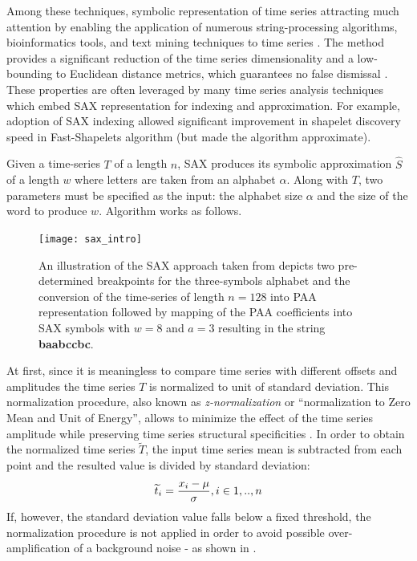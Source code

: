 Among these techniques, symbolic representation of time series attracting much attention by enabling the application of numerous 
string-processing algorithms, bioinformatics tools, and text mining techniques to time series \cite{sax}. 
The method provides a significant reduction of the time series dimensionality and a low-bounding to Euclidean distance 
metrics, which guarantees no false dismissal \cite{citeulike:2821475}. 
These properties are often leveraged by many time series analysis techniques which embed SAX representation for indexing and 
approximation. For example, adoption of SAX indexing allowed significant improvement in shapelet discovery speed in Fast-Shapelets 
algorithm \cite{citeulike:12563493} (but made the algorithm approximate). 

Given a time-series $T$ of a length $n$, SAX produces its symbolic approximation $\hat{S}$ of a length $w$ where letters are taken 
from an alphabet $\alpha$. Along with $T$, two parameters must be specified as the input: the alphabet size $\alpha$ and the size of 
the word to produce $w$. Algorithm works as follows. 

\begin{figure}[tbp]
   \centering
   \texttt{[image: sax\_intro]}
   \caption{An illustration of the SAX approach taken from \cite{citeulike:2821475} depicts two pre-determined breakpoints for the 
   three-symbols alphabet and the conversion of the time-series of length $n=128$ into PAA representation followed by mapping of 
   the PAA coefficients into SAX symbols with $w=8$ and $a=3$ resulting in the string \textbf{baabccbc}.}
   \label{fig:sax_intro}
\end{figure}

At first, since it is meaningless to compare time series with different offsets and amplitudes \cite{citeulike:532340} the time series 
$T$ is normalized to unit of standard deviation. This normalization procedure, also known as \textit{z-normalization} or 
``normalization to Zero Mean and Unit of Energy'', allows to minimize the effect of the time series amplitude while preserving time 
series structural specificities \cite{citeulike:3815880}. In order to obtain the normalized time series $\widetilde{T}$, the 
input time series mean is subtracted from each point and the resulted value is divided by standard deviation:
\begin{equation}
\Large
\widetilde{t}_{i} = \frac{x_{i}-\mu}{\sigma}, i \in {1,..,n}
\label{eq:znorm}
\end{equation}
If, however, the standard deviation value falls below a fixed threshold, the normalization procedure is not applied in order to avoid 
possible over-amplification of a background noise - as shown in \cite{citeulike:2821475}.

